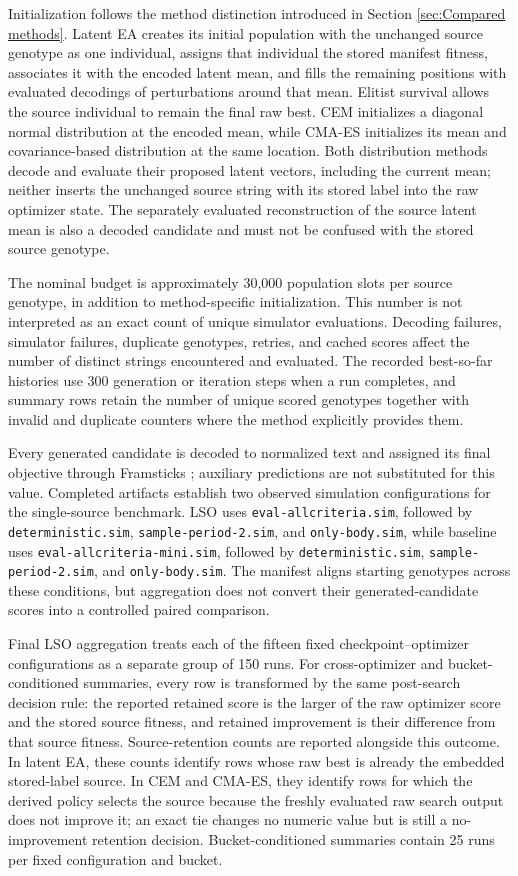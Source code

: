 Initialization follows the method distinction introduced in Section \ref{sec:Compared methods}. Latent EA creates its initial population with the unchanged source genotype as one individual, assigns that individual the stored manifest fitness, associates it with the encoded latent mean, and fills the remaining positions with evaluated decodings of perturbations around that mean. Elitist survival allows the source individual to remain the final raw best. CEM initializes a diagonal normal distribution at the encoded mean, while CMA-ES initializes its mean and covariance-based distribution at the same location. Both distribution methods decode and evaluate their proposed latent vectors, including the current mean; neither inserts the unchanged source string with its stored label into the raw optimizer state. The separately evaluated reconstruction of the source latent mean is also a decoded candidate and must not be confused with the stored source genotype.

The nominal budget is approximately 30,000 population slots per source genotype, in addition to method-specific initialization. This number is not interpreted as an exact count of unique simulator evaluations. Decoding failures, simulator failures, duplicate genotypes, retries, and cached scores affect the number of distinct strings encountered and evaluated. The recorded best-so-far histories use 300 generation or iteration steps when a run completes, and summary rows retain the number of unique scored genotypes together with invalid and duplicate counters where the method explicitly provides them.

Every generated candidate is decoded to normalized \fone{} text and assigned its final objective through Framsticks \vertpos{}; auxiliary predictions are not substituted for this value. Completed artifacts establish two observed simulation configurations for the single-source benchmark. LSO uses \texttt{eval-allcriteria.sim}, followed by \texttt{deterministic.sim}, \texttt{sample-period-2.sim}, and \texttt{only-body.sim}, while baseline uses \texttt{eval-allcriteria-mini.sim}, followed by \texttt{deterministic.sim}, \texttt{sample-period-2.sim}, and \texttt{only-body.sim}. The manifest aligns starting genotypes across these conditions, but aggregation does not convert their generated-candidate scores into a controlled paired comparison.

Final LSO aggregation treats each of the fifteen fixed checkpoint--optimizer configurations as a separate group of 150 runs. For cross-optimizer and bucket-conditioned summaries, every row is transformed by the same post-search decision rule: the reported retained score is the larger of the raw optimizer score and the stored source fitness, and retained improvement is their difference from that source fitness. Source-retention counts are reported alongside this outcome. In latent EA, these counts identify rows whose raw best is already the embedded stored-label source. In CEM and CMA-ES, they identify rows for which the derived policy selects the source because the freshly evaluated raw search output does not improve it; an exact tie changes no numeric value but is still a no-improvement retention decision. Bucket-conditioned summaries contain 25 runs per fixed configuration and bucket. 

